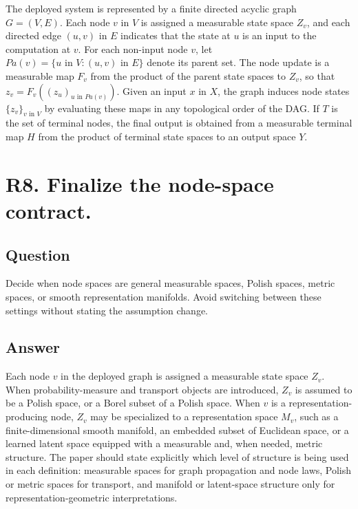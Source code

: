 \documentclass[11pt,a4paper]{article}
\begin{document}
The deployed system is represented by a finite directed acyclic graph \(G=(V,E)\). Each node \(v\) in \(V\) is assigned a measurable state space \(Z_v\), and each directed edge \((u,v)\) in \(E\) indicates that the state at \(u\) is an input to the computation at \(v\). For each non-input node \(v\), let \(Pa(v) = \{u \text{ in } V : (u,v) \text{ in } E\}\) denote its parent set. The node update is a measurable map \(F_v\) from the product of the parent state spaces to \(Z_v\), so that \(z_v = F_v((z_u)_{u \text{ in } Pa(v)})\). Given an input \(x\) in \(X\), the graph induces node states \(\{z_v\}_{v \text{ in } V}\) by evaluating these maps in any topological order of the DAG. If \(T\) is the set of terminal nodes, the final output is obtained from a measurable terminal map \(H\) from the product of terminal state spaces to an output space \(Y\).

\section*{R8. Finalize the node-space contract.}

\subsection*{Question}

Decide when node spaces are general measurable spaces, Polish spaces, metric spaces, or smooth representation manifolds. Avoid switching between these settings without stating the assumption change.

\subsection*{Answer}

Each node \(v\) in the deployed graph is assigned a measurable state space \(Z_v\). When probability-measure and transport objects are introduced, \(Z_v\) is assumed to be a Polish space, or a Borel subset of a Polish space. When \(v\) is a representation-producing node, \(Z_v\) may be specialized to a representation space \(M_v\), such as a finite-dimensional smooth manifold, an embedded subset of Euclidean space, or a learned latent space equipped with a measurable and, when needed, metric structure. The paper should state explicitly which level of structure is being used in each definition: measurable spaces for graph propagation and node laws, Polish or metric spaces for transport, and manifold or latent-space structure only for representation-geometric interpretations.
\end{document}
